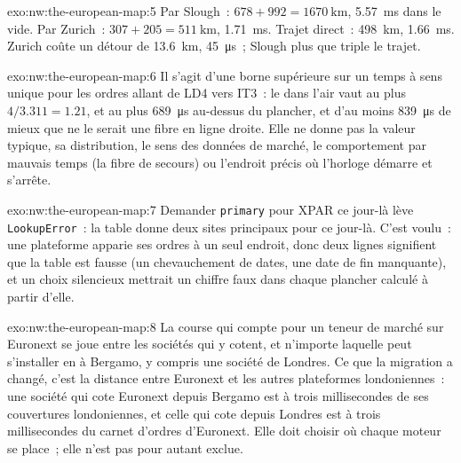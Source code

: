 \begin{solution}{exo:nw:the-european-map:5}
Par Slough~: $678 + 992 = \qty{1670}{\kilo\metre}$, \qty{5.57}{\milli\second} dans le vide. Par Zurich~: $307 + 205 = \qty{511}{\kilo\metre}$,
\qty{1.71}{\milli\second}. Trajet direct~: \qty{498}{\kilo\metre}, \qty{1.66}{\milli\second}. Zurich coûte un détour de \qty{13.6}{\kilo\metre},
\qty{45}{\micro\second}~; Slough plus que triple le trajet.
\end{solution}

\begin{solution}{exo:nw:the-european-map:6}
Il s'agit d'une borne supérieure sur un temps à sens unique pour les ordres allant de LD4 vers IT3~: le  dans l'air vaut au plus $4/3.311 = 1.21$, et au plus
\qty{689}{\micro\second} au-dessus du plancher, et d'au moins \qty{839}{\micro\second} de mieux que ne le serait une fibre en ligne droite. Elle ne donne pas la
valeur typique, sa distribution, le sens des données de marché, le comportement par mauvais temps (la fibre de secours) ou
l'endroit précis où l'horloge démarre et s'arrête.
\end{solution}

\begin{solution}{exo:nw:the-european-map:7}
Demander \texttt{primary} pour XPAR ce jour-là lève \texttt{LookupError}~: la table donne deux sites principaux pour ce jour-là. C'est voulu~: une plateforme apparie
ses ordres à un seul endroit, donc deux lignes signifient que la table est fausse (un chevauchement de dates, une date de fin manquante), et un choix silencieux
mettrait un chiffre faux dans chaque plancher calculé à partir d'elle.
\end{solution}

\begin{solution}{exo:nw:the-european-map:8}
La course qui compte pour un teneur de marché sur Euronext se joue entre les sociétés qui y cotent, et n'importe laquelle peut s'installer en  à Bergamo, y compris une
société de Londres. Ce que la migration a changé, c'est la distance entre Euronext et les autres plateformes londoniennes~: une société qui cote Euronext depuis Bergamo est
à trois millisecondes de ses couvertures londoniennes, et celle qui cote depuis Londres est à trois millisecondes du carnet d'ordres d'Euronext. Elle doit choisir où chaque
moteur se place~; elle n'est pas pour autant exclue.
\end{solution}

